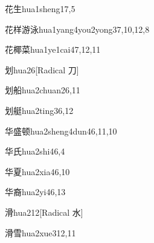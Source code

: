 \begin{verbete}{花生}{hua1sheng1}{7,5}
\end{verbete}

\begin{verbete}{花样游泳}{hua1yang4you2yong3}{7,10,12,8}
\end{verbete}

\begin{verbete}{花椰菜}{hua1ye1cai4}{7,12,11}
\end{verbete}

\begin{verbete}{划}{hua2}{6}[Radical 刀]
\end{verbete}

\begin{verbete}{划船}{hua2chuan2}{6,11}
\end{verbete}

\begin{verbete}{划艇}{hua2ting3}{6,12}
\end{verbete}

\begin{verbete}{华盛顿}{hua2sheng4dun4}{6,11,10}
\end{verbete}

\begin{verbete}{华氏}{hua2shi4}{6,4}
\end{verbete}

\begin{verbete}{华夏}{hua2xia4}{6,10}
\end{verbete}

\begin{verbete}{华裔}{hua2yi4}{6,13}
\end{verbete}

\begin{verbete}{滑}{hua2}{12}[Radical 水]
\end{verbete}

\begin{verbete}{滑雪}{hua2xue3}{12,11}
\end{verbete}

